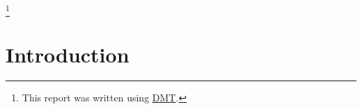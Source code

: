 \documentclass[12pt,a4paper]{article}
\begin{document}
 


\maketitle

\footnote{This report was written using
  \href{https://github.com/BlueBrain/DMT}{DMT}.}

\begin{abstract}
\end{abstract}

\section*{Introduction}


\newpage
\end{document}
